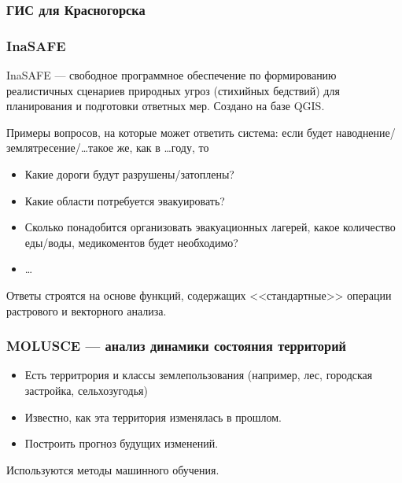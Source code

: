 \begin{frame}
    \frametitle{ГИС для Красногорска}

\end{frame}

\begin{frame}
    \frametitle{InaSAFE}
    InaSAFE --- свободное программное обеспечение по
    формированию реалистичных сценариев природных
    угроз (стихийных бедствий) для планирования и подготовки ответных мер. Создано на базе QGIS.

    Примеры вопросов, на которые может ответить
    система: если будет наводнение/землятресение/\dots такое же, как в \dots году, то
    \begin{itemize}
        \item Какие дороги будут разрушены/затоплены?
        \item Какие области потребуется эвакуировать?
        \item Сколько понадобится организовать
        эвакуационных лагерей, какое количество еды/воды, медикоментов будет необходимо?
        \item \dots
    \end{itemize}

    Ответы строятся на основе функций, содержащих
    <<стандартные>> операции растрового и векторного анализа.
\end{frame}

\begin{frame}
    \frametitle{MOLUSCE --- анализ динамики состояния территорий}
    \begin{itemize}
        \item Есть территрория и классы землепользования
        (например, лес, городская застройка, сельхозугодья)
        \item Известно, как эта территория изменялась в прошлом.
        \item Построить прогноз будущих изменений.
    \end{itemize}
    Используются методы машинного обучения.
\end{frame}

